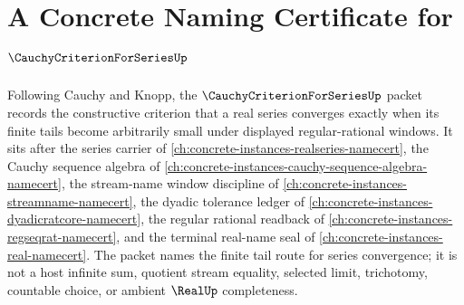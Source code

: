 \chapter{A Concrete Naming Certificate for $\CauchyCriterionForSeriesUp$}
\label{ch:concrete-instances-cauchy-criterion-for-series-namecert}

Following Cauchy and Knopp, the $\CauchyCriterionForSeriesUp$ packet records the constructive criterion that a real series converges exactly when its finite tails become arbitrarily small under displayed regular-rational windows. It sits after the series carrier of \autoref{ch:concrete-instances-realseries-namecert}, the Cauchy sequence algebra of \autoref{ch:concrete-instances-cauchy-sequence-algebra-namecert}, the stream-name window discipline of \autoref{ch:concrete-instances-streamname-namecert}, the dyadic tolerance ledger of \autoref{ch:concrete-instances-dyadicratcore-namecert}, the regular rational readback of \autoref{ch:concrete-instances-regseqrat-namecert}, and the terminal real-name seal of \autoref{ch:concrete-instances-real-namecert}. The packet names the finite tail route for series convergence; it is not a host infinite sum, quotient stream equality, selected limit, trichotomy, countable choice, or ambient $\RealUp$ completeness.

